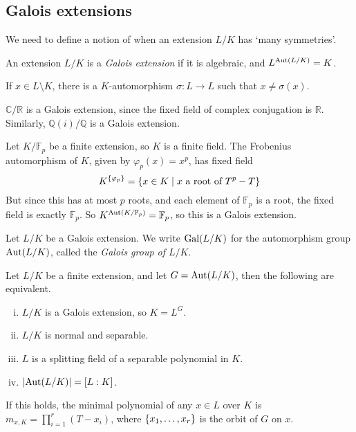 \subsection{Galois extensions}
We need to define a notion of when an extension \( L / K \) has `many symmetries'.
\begin{definition}
	An extension \( L / K \) is a \emph{Galois extension} if it is algebraic, and \( L^{\operatorname{Aut}(L/K)} = K \).
\end{definition}
\begin{remark}
	If \( x \in L \setminus K \), there is a \( K \)-automorphism \( \sigma : L \to L \) such that \( x \neq \sigma(x) \).
\end{remark}
\begin{example}
	\( \mathbb C / \mathbb R \) is a Galois extension, since the fixed field of complex conjugation is \( \mathbb R \).
	Similarly, \( \mathbb Q(i) / \mathbb Q \) is a Galois extension.
\end{example}
\begin{example}
	Let \( K / \mathbb F_p \) be a finite extension, so \( K \) is a finite field.
	The Frobenius automorphism of \( K \), given by \( \varphi_p(x) = x^p \), has fixed field
	\[ K^{\qty{\varphi_p}} = \qty{x \in K \mid x \text{ a root of } T^p - T} \]
	But since this has at most \( p \) roots, and each element of \( \mathbb F_p \) is a root, the fixed field is exactly \( \mathbb F_p \).
	So \( K^{\operatorname{Aut}(K/\mathbb F_p)} = \mathbb F_p \), so this is a Galois extension.
\end{example}
\begin{definition}
	Let \( L / K \) be a Galois extension.
	We write \( \operatorname{Gal}(L/K) \) for the automorphism group \( \operatorname{Aut}(L/K) \), called the \emph{Galois group of \( L / K \)}.
\end{definition}
\begin{theorem}
	Let \( L / K \) be a finite extension, and let \( G = \operatorname{Aut}(L/K) \), then the following are equivalent.
	\begin{enumerate}[(i)]
		\item \( L / K \) is a Galois extension, so \( K = L^G \).
		\item \( L / K \) is normal and separable.
		\item \( L \) is a splitting field of a separable polynomial in \( K \).
		\item \( \abs{\operatorname{Aut}(L/K)} = [L : K] \).
	\end{enumerate}
	If this holds, the minimal polynomial of any \( x \in L \) over \( K \) is \( m_{x,K} = \prod_{i=1}^r (T - x_i) \), where \( \qty{x_1, \dots, x_r} \) is the orbit of \( G \) on \( x \).
\end{theorem}
